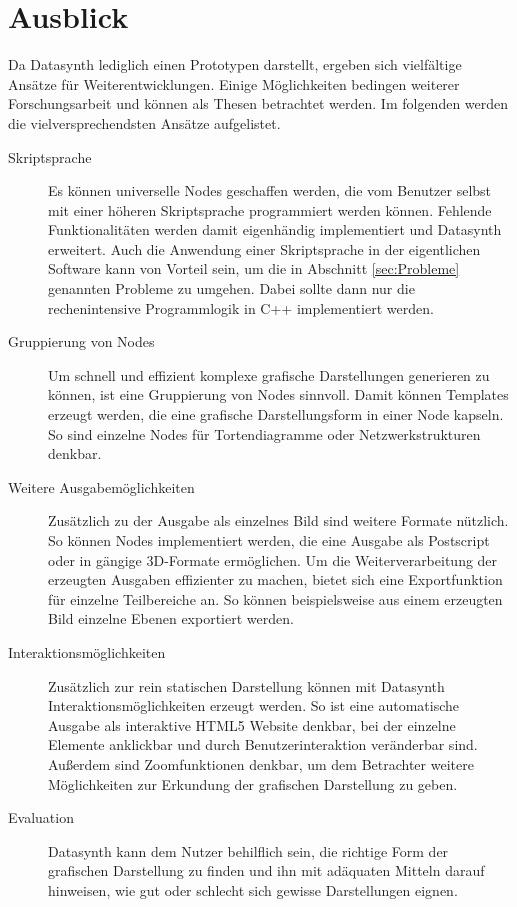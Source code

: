 \documentclass[a4paper, 12pt, DIV=calc, version=first, pdftex, headsepline, footsepline, bibtotocnumbered, liststotocnumbered]{scrreprt}
\begin{document}
\section{Ausblick}
\label{sec:Ausblick}
Da Datasynth lediglich einen Prototypen darstellt, ergeben sich vielfältige
Ansätze für Weiterentwicklungen. Einige Möglichkeiten bedingen weiterer 
Forschungsarbeit und können als Thesen betrachtet werden. Im folgenden
werden die vielversprechendsten Ansätze aufgelistet.
\begin{description}
\item[Skriptsprache]
Es können universelle Nodes geschaffen werden, die vom Benutzer selbst mit einer höheren
Skriptsprache programmiert werden können. Fehlende Funktionalitäten
werden damit eigenhändig implementiert und Datasynth erweitert.
Auch die Anwendung einer Skriptsprache in der eigentlichen Software kann von Vorteil sein, um die in
Abschnitt \ref{sec:Probleme} genannten Probleme zu umgehen. Dabei sollte dann nur
die rechenintensive Programmlogik in C++ implementiert werden.
\item[Gruppierung von Nodes]
Um schnell und effizient komplexe grafische Darstellungen generieren zu können,
ist eine Gruppierung von Nodes sinnvoll. Damit können Templates erzeugt werden,
die eine grafische Darstellungsform in einer Node kapseln. So sind einzelne Nodes
für Tortendiagramme oder Netzwerkstrukturen denkbar.
\item[Weitere Ausgabemöglichkeiten]
Zusätzlich zu der Ausgabe als einzelnes Bild sind weitere Formate nützlich.
So können Nodes implementiert werden, die eine Ausgabe als Postscript oder
in gängige 3D-Formate ermöglichen. Um die Weiterverarbeitung der erzeugten
Ausgaben effizienter zu machen, bietet sich eine Exportfunktion für einzelne Teilbereiche
an. So können beispielsweise aus einem erzeugten Bild einzelne Ebenen exportiert werden.
\item[Interaktionsmöglichkeiten]
Zusätzlich zur rein statischen Darstellung können mit Datasynth
Interaktionsmöglichkeiten erzeugt werden. So ist eine automatische
Ausgabe als interaktive HTML5 Website denkbar, bei der einzelne Elemente
anklickbar und durch Benutzerinteraktion veränderbar sind. Außerdem sind 
Zoomfunktionen denkbar, um dem Betrachter weitere Möglichkeiten zur
Erkundung der grafischen Darstellung zu geben.
\item[Evaluation]
Datasynth kann dem Nutzer behilflich sein, die richtige Form
der grafischen Darstellung zu finden und ihn mit adäquaten Mitteln darauf
hinweisen, wie gut oder schlecht sich gewisse Darstellungen eignen.
\end{description}
    
\end{document}
